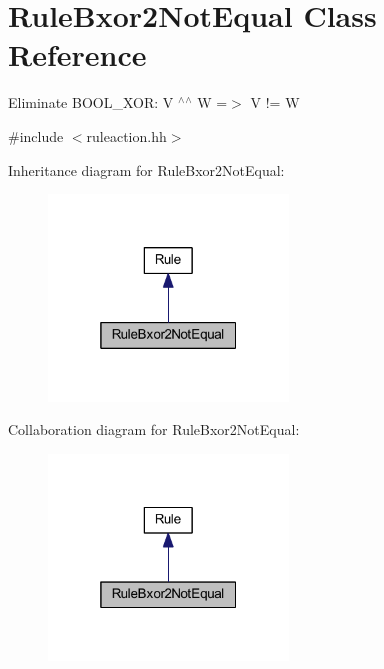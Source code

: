 \hypertarget{class_rule_bxor2_not_equal}{}\section{Rule\+Bxor2\+Not\+Equal Class Reference}
\label{class_rule_bxor2_not_equal}


Eliminate B\+O\+O\+L\+\_\+\+X\+OR\+: {\ttfamily V $^\wedge$$^\wedge$ W =$>$ V != W}  




{\ttfamily \#include $<$ruleaction.\+hh$>$}



Inheritance diagram for Rule\+Bxor2\+Not\+Equal\+:
\nopagebreak
\begin{figure}[H]
\begin{center}
\leavevmode
\includegraphics[width=181pt]{class_rule_bxor2_not_equal__inherit__graph}
\end{center}
\end{figure}


Collaboration diagram for Rule\+Bxor2\+Not\+Equal\+:
\nopagebreak
\begin{figure}[H]
\begin{center}
\leavevmode
\includegraphics[width=181pt]{class_rule_bxor2_not_equal__coll__graph}
\end{center}
\end{figure}
